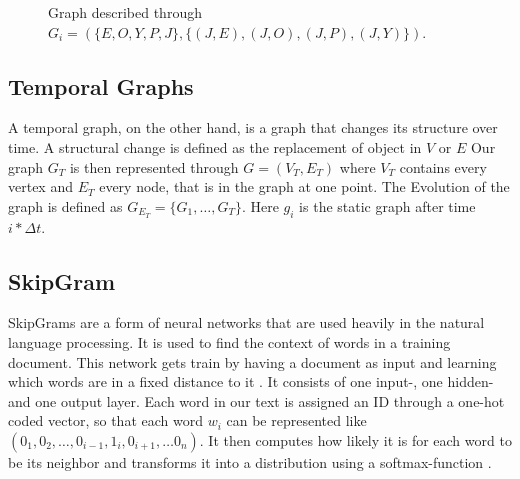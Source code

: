 \documentclass[sigconf]{acmart}
\begin{document}
 \begin{figure}[h]
  \begin{center}
\end{center}
\caption{Graph described through \\ \( G_i = (\{E,O,Y,P,J\}, \{(J,E),(J,O), (J,P), (J,Y)\}) \).}
\end{figure}

\subsection{Temporal Graphs}
A temporal graph, on the other hand, is a graph that changes its structure over time. A structural change is defined as the replacement of object in \(V\) or \(E\)  %
Our graph \(G_T\) is then represented through \(G = (V_T,E_T)\) where \(V_T\) contains every vertex and \(E_T\) every node, that is in the graph at one point.
The Evolution of the graph is defined as \(G_{E_T} = \{G_1, \ldots, G_T\}\). Here \(g_i\) is the static graph after time \(i*\Delta t\).
\cite{DBLP:journals/corr/abs-1905-05304}

\subsection{SkipGram}
SkipGrams are a form of neural networks that are used heavily in the natural language processing. It is used to find the context of words in a training document.
This network gets train by having a document as input and learning which words are in a fixed distance to it \cite{Rong.11.11.2014}.
It consists of one input-, one hidden- and one output layer. 
Each word in our text is assigned an ID through a one-hot coded vector, so that each word \(w_i\) can be represented like \((0_1, 0_2, \ldots, 0_{i-1}, 1_i, 0_{i+1}, \ldots 0_n)\).
It then computes how likely it is for each word to be its neighbor and transforms it into a distribution using a softmax-function \cite{gao2018properties}.
\end{document}
